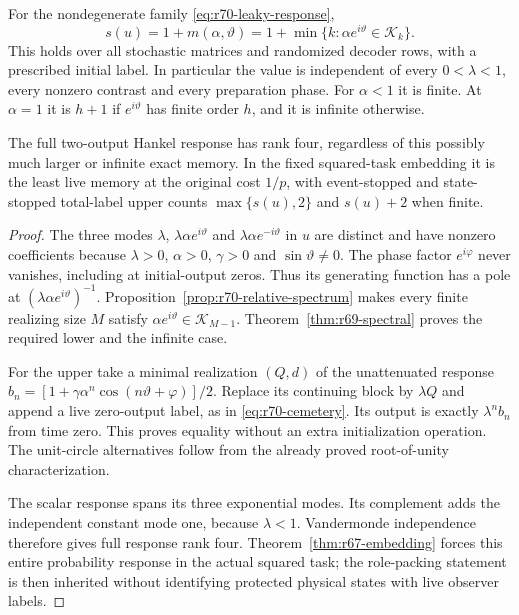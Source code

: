\begin{theorem}\label{thm:r70-leakage}
For the nondegenerate family \eqref{eq:r70-leaky-response},
\begin{equation}\label{eq:r70-exact}
 s(u)=1+m(\alpha,\vartheta)
     =1+\min\{k:\alpha e^{i\vartheta}\in\mathcal K_k\}.
\end{equation}
This holds over all stochastic matrices and randomized decoder rows, with a prescribed initial label. In particular the value is independent of every $0<\lambda<1$, every nonzero contrast and every preparation phase. For $\alpha<1$ it is finite. At $\alpha=1$ it is $h+1$ if $e^{i\vartheta}$ has finite order $h$, and it is infinite otherwise.

The full two-output Hankel response has rank four, regardless of this possibly much larger or infinite exact memory. In the fixed squared-task embedding it is the least live memory at the original cost $1/p$, with event-stopped and state-stopped total-label upper counts $\max\{s(u),2\}$ and $s(u)+2$ when finite.
\end{theorem}
\begin{proof}
The three modes $\lambda$, $\lambda\alpha e^{i\vartheta}$ and $\lambda\alpha e^{-i\vartheta}$ in $u$ are distinct and have nonzero coefficients because $\lambda>0$, $\alpha>0$, $\gamma>0$ and $\sin\vartheta\ne0$. The phase factor $e^{i\varphi}$ never vanishes, including at initial-output zeros. Thus its generating function has a pole at $(\lambda\alpha e^{i\vartheta})^{-1}$. Proposition~\ref{prop:r70-relative-spectrum} makes every finite realizing size $M$ satisfy $\alpha e^{i\vartheta}\in\mathcal K_{M-1}$. Theorem~\ref{thm:r69-spectral} proves the required lower and the infinite case.

For the upper take a minimal realization $(Q,d)$ of the unattenuated response
$b_n=[1+\gamma\alpha^n\cos(n\vartheta+\varphi)]/2$.
Replace its continuing block by $\lambda Q$ and append a live zero-output label, as in \eqref{eq:r70-cemetery}. Its output is exactly $\lambda^nb_n$ from time zero. This proves equality without an extra initialization operation. The unit-circle alternatives follow from the already proved root-of-unity characterization.

The scalar response spans its three exponential modes. Its complement adds the independent constant mode one, because $\lambda<1$. Vandermonde independence therefore gives full response rank four. Theorem~\ref{thm:r67-embedding} forces this entire probability response in the actual squared task; the role-packing statement is then inherited without identifying protected physical states with live observer labels.
\end{proof}

